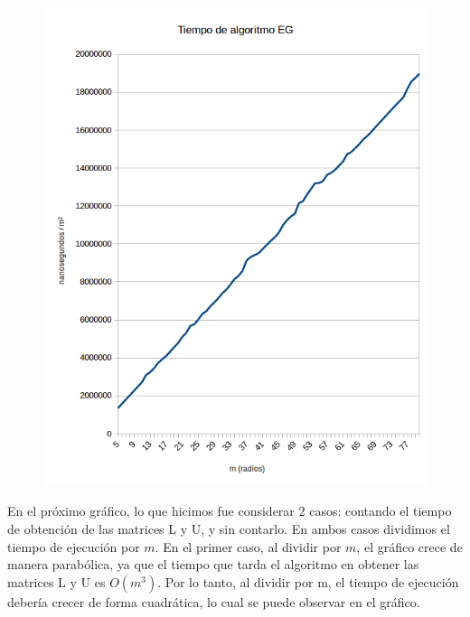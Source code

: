 \begin{figure}[h]
  \center
  \includegraphics[scale=0.8]{imagenes/tiempoEGdivididoM2.png}
  \label{fig:egdivididom2}
\end{figure}

En el próximo gráfico, lo que hicimos fue considerar 2 casos: contando el tiempo de obtención de las matrices L y U, y sin contarlo. En ambos casos dividimos el tiempo de ejecución por $m$. En el primer caso, al dividir por $m$, el gráfico crece de manera parabólica, ya que el tiempo que tarda el algoritmo en obtener las matrices L y U es $O(m^{3})$. Por lo tanto, al dividir por m, el tiempo de ejecución debería crecer de forma cuadrática, lo cual se puede observar en el gráfico. 


